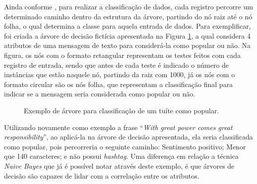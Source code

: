 \documentclass[oneside,openright,12pt]{ufsm_2015} %
\begin{document}
    \par Ainda conforme \cite{book:han:11}, para realizar a classificação de dados, cada registro percorre um determinado caminho dentro da estrutura da árvore, partindo do nó raiz até o nó folha, o qual determina a classe para aquela entrada de dados. Para exemplificar, foi criada a árvore de decisão fictícia apresentada na Figura \ref{fig:exemplo_arvore}, a qual considera 4 atributos de uma mensagem de texto para considerá-la como popular ou não. Na figura, os nós com o formato retangular representam os testes feitos com cada registro de entrada, sendo que antes de cada teste é indicado o número de instâncias que estão naquele nó, partindo da raiz com 1000, já os nós com o formato circular são os nós folha, que representam a classificação final para indicar se a mensagem seria considerada como popular ou não.
    
    \begin{figure}[!ht]
    \caption{Exemplo de árvore para classificação de um tuíte como popular.}
    \centering
    \label{fig:exemplo_arvore}
    \end{figure}
    
    \par Utilizando novamente como exemplo a frase ``\textit{With great power comes great responsibility}'', ao aplicá-la na árvore de decisão apresentada, ela seria classificada como popular, pois percorreria o seguinte caminho: Sentimento positivo; Menor que 140 caracteres; e não possui \textit{hashtag}. Uma diferença em relação a técnica \textit{Naive Bayes} que já é possível notar através deste exemplo, é que árvores de decisão são capazes de lidar com a correlação entre os atributos.
    
\end{document}
